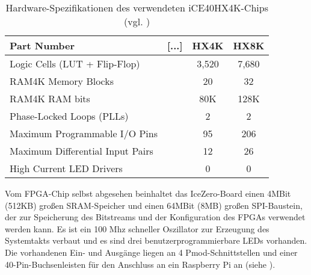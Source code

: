 \begin{table}[H]
\centering
\begin{tabular}{|l|l|c|c|}
\hline
\rowcolor[HTML]{EFEFEF} 
\textbf{Part Number}             & {[}...{]} & \multicolumn{1}{l|}{\cellcolor[HTML]{EFEFEF}\textbf{HX4K}} & \multicolumn{1}{l|}{\cellcolor[HTML]{EFEFEF}\textbf{HX8K}} \\ \hline
Logic Cells (LUT + Flip-Flop)    &           & 3,520                                                      & 7,680                                                      \\ \hline
RAM4K Memory Blocks              &           & 20                                                         & 32                                                         \\ \hline
RAM4K RAM bits                   &           & 80K                                                        & 128K                                                       \\ \hline
Phase-Locked Loops (PLLs)        &           & 2                                                          & 2                                                          \\ \hline
Maximum Programmable I/O Pins    &           & 95                                                         & 206                                                        \\ \hline
Maximum Differential Input Pairs &           & 12                                                         & 26                                                         \\ \hline
High Current LED Drivers         &           & 0                                                          & 0                                                          \\ \hline
\end{tabular}
	\caption{Hardware-Spezifikationen des verwendeten iCE40HX4K-Chips (vgl. \cite{doc:datasheet})}
\label{tbl:ice40_specs}
\end{table}

Vom FPGA-Chip selbst abgesehen beinhaltet das IceZero-Board einen 4MBit (512KB) großen SRAM-Speicher und einen 64MBit (8MB) großen SPI-Baustein, der zur Speicherung des Bitstreams und der Konfiguration des FPGAs verwendet werden kann.
Es ist ein 100 Mhz schneller Oszillator zur Erzeugung des Systemtakts verbaut und es sind drei benutzerprogrammierbare LEDs vorhanden.
Die vorhandenen Ein- und Ausgänge liegen an 4 \gls{Pmod}-Schnittstellen und einer 40-Pin-Buchsenleisten für den Anschluss an ein Raspberry Pi an (siehe \cite{web:trenz_icezero}). 


